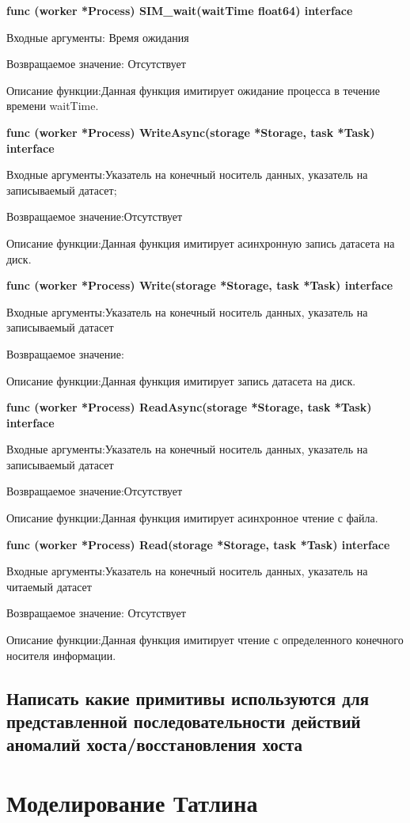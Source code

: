 \textbf{func (worker *Process) SIM\_wait(waitTime float64) interface}

Входные аргументы: Время ожидания

Возвращаемое значение: Отсутствует

Описание функции:Данная функция имитирует ожидание процесса в течение времени waitTime. 

\textbf{func (worker *Process) WriteAsync(storage *Storage, task *Task) interface}

Входные аргументы:Указатель на конечный носитель данных, указатель на записываемый датасет;

Возвращаемое значение:Отсутствует

Описание функции:Данная функция имитирует асинхронную запись датасета на диск.

\textbf{func (worker *Process) Write(storage *Storage, task *Task) interface}

Входные аргументы:Указатель на конечный носитель данных, указатель на записываемый датасет

Возвращаемое значение:

Описание функции:Данная функция имитирует запись датасета на диск.

\textbf{func (worker *Process) ReadAsync(storage *Storage, task *Task) interface}

Входные аргументы:Указатель на конечный носитель данных, указатель на записываемый датасет

Возвращаемое значение:Отсутствует

Описание функции:Данная функция имитирует асинхронное чтение с файла. 

\textbf{func (worker *Process) Read(storage *Storage, task *Task) interface}

Входные аргументы:Указатель на конечный носитель данных, указатель на читаемый датасет

Возвращаемое значение: Отсутствует

Описание функции:Данная функция имитирует чтение с определенного конечного носителя информации.
\subsection{Написать какие примитивы используются для представленной последовательности действий аномалий хоста/восстановления хоста}

\section{Моделирование Татлина}\label{Tatlin}
